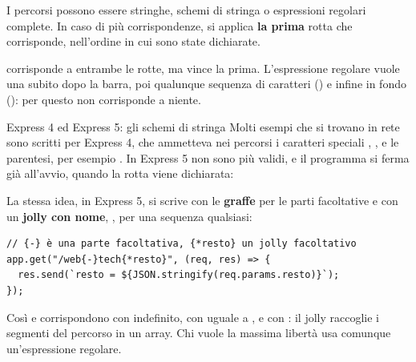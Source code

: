 I percorsi possono essere stringhe, schemi di stringa o espressioni regolari
complete. In caso di più corrispondenze, si applica \textbf{la prima} rotta che
corrisponde, nell'ordine in cui sono state dichiarate.


 corrisponde a entrambe le rotte, ma vince la prima. L'espressione
regolare  vuole una  subito dopo la
barra, poi qualunque sequenza di caratteri () e infine  in
fondo (\code{\$}): per questo  non corrisponde a niente.

\begin{warningbox}{{Express 4 ed Express 5: gli schemi di stringa}}
  Molti esempi che si trovano in rete sono scritti per Express 4, che ammetteva
  nei percorsi i caratteri speciali , \code{+}, \code{*} e le
  parentesi, per esempio . In Express 5 non sono più
  validi, e il programma si ferma già all'avvio, quando la rotta viene
  dichiarata:
  La stessa idea, in Express 5, si scrive con le \textbf{graffe} per le parti
  facoltative e con un \textbf{jolly con nome}, , per una sequenza
  qualsiasi:
\begin{lstlisting}[style=js, name=express5.js]
// {-} è una parte facoltativa, {*resto} un jolly facoltativo
app.get("/web{-}tech{*resto}", (req, res) => {
  res.send(`resto = ${JSON.stringify(req.params.resto)}`);
});
\end{lstlisting}
  Così  e  corrispondono con 
  indefinito,  con  uguale a
  \code{["nologies"]}, e  con
  \code{["","corso","2026"]}: il jolly raccoglie i segmenti del percorso in un
  array. Chi vuole la massima libertà usa comunque un'espressione regolare.
\end{warningbox}


